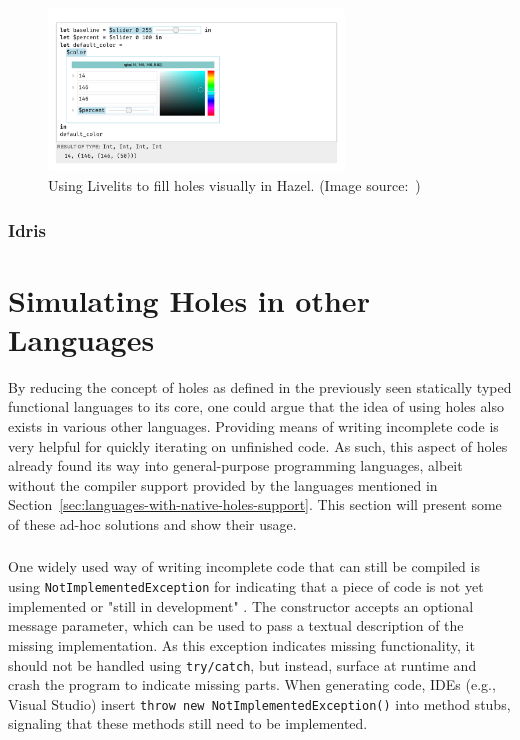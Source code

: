 \begin{figure}
    \centering
    \includegraphics[width=0.7\textwidth]{images/hazel}
    \caption{Using Livelits to fill holes visually in Hazel. (Image source:~\cite{omar_filling_2021})}
    \label{fig:hazel-livelits}
\end{figure}

\subsubsection{Idris}

\section{Simulating Holes in other Languages}
\label{sec:simulating-holes}
By reducing the concept of holes as defined in the previously seen statically typed functional languages to its core, one could argue that the idea of using holes also exists in various other languages.
Providing means of writing incomplete code is very helpful for quickly iterating on unfinished code.
As such, this aspect of holes already found its way into general-purpose programming languages, albeit without the compiler support provided by the languages mentioned in Section~\ref{sec:languages-with-native-holes-support}.
This section will present some of these ad-hoc solutions and show their usage.

\subsubsection{\CS}
One widely used way of writing incomplete \CS\-code that can still be compiled is using \texttt{NotImplementedException} \cite{microsoft_notimplementedexception_2020} for indicating that a piece of code is not yet implemented or "still in development" \cite{microsoft_notimplementedexception_2020}.
The constructor accepts an optional message parameter, which can be used to pass a textual description of the missing implementation.
As this exception indicates missing functionality, it should not be handled using \texttt{try/catch}, but instead, surface at runtime and crash the program to indicate missing parts.
When generating code, IDEs (e.g., Visual Studio) insert \texttt{throw new NotImplementedException()} into method stubs, signaling that these methods still need to be implemented.

